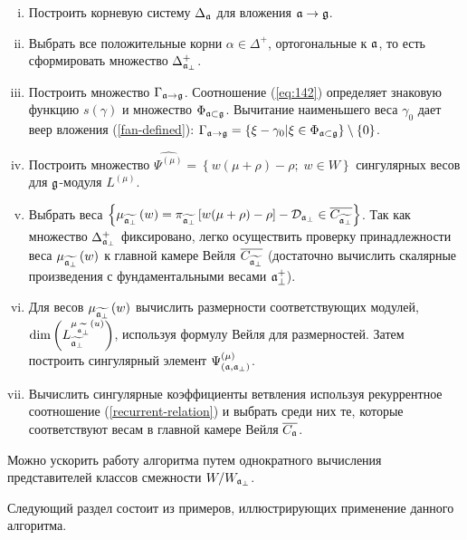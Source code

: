 \begin{enumerate}[(i)]
\item Построить корневую систему $\Delta _{\mathfrak{a}}$ для вложения $\mathfrak{a}\rightarrow \mathfrak{g}$.

\item Выбрать все положительные корни $\alpha \in \Delta ^{+}$, ортогональные к  $\mathfrak{a}$, то есть сформировать множество $\Delta_{\mathfrak{a}_{\perp} }^{+}$.

\item Построить множество $\Gamma _{\mathfrak{a}\rightarrow \mathfrak{g}}$. Соотношение  (\ref{eq:142}) определяет знаковую функцию $s(\gamma)$ и множество $\Phi_{\mathfrak{a}\subset \mathfrak{g}}$. Вычитание наименьшего веса $\gamma_0$ дает веер вложения (\ref{fan-defined}):
 $\Gamma _{\mathfrak{a}\rightarrow \mathfrak{g}}=\left\{ \xi -\gamma _{0}|\xi \in \Phi _{\mathfrak{a}\subset \mathfrak{g}}\right\} \setminus \left\{ 0\right\}$.

\item Построить множество $\widehat{\Psi ^{(\mu )}}=\left\{ w (\mu +\rho
)-\rho ;\;w \in W\right\} $ сингулярных весов для  $\mathfrak{g}$-модуля $L^{(\mu )}$.

\item Выбрать веса $\left\{ \mu _{\widetilde{\mathfrak{a}_{\perp}}}\left( w\right) =\pi _{\widetilde{\mathfrak{a}_{\perp}}}\left[ w(\mu +\rho
)-\rho \right] -\mathcal{D}_{\mathfrak{a}_{\perp}}\in \overline{C_{\widetilde{\mathfrak{a}_{\perp}}}}\right\} $. Так как множество  $\Delta_{\mathfrak{a}_{\perp} }^{+}$ фиксировано, легко осуществить проверку принадлежности веса $\mu _{\widetilde{\mathfrak{a}_{\perp}}}\left( w\right) $ к главной камере Вейля $\overline{C_{\widetilde{\mathfrak{a}_{\perp}}}}$ (достаточно вычислить скалярные произведения с фундаментальными весами $\mathfrak{a}_{\perp}^{+}$).

\item Для весов $\mu _{\widetilde{\mathfrak{a}_{\perp}}}\left( w\right) $ вычислить размерности соответствующих модулей, $\mathrm{\dim }\left(L_{\widetilde{\mathfrak{a}_{\perp}}}^{\mu _{\widetilde{\mathfrak{a}_{\perp}}}\left( u\right) }\right) $, используя формулу Вейля для размерностей. Затем построить сингулярный элемент $\Psi ^{\left( \mu \right) }_{\left(  \mathfrak{a}, \mathfrak{a}_{\perp} \right)}$.

\item Вычислить сингулярные коэффициенты ветвления используя рекуррентное соотношение (\ref{recurrent-relation}) и выбрать среди них те, которые соответствуют весам в главной камере Вейля $\overline{C_{\mathfrak{a}}}$.
\end{enumerate}

Можно ускорить работу алгоритма путем однократного вычисления представителей классов смежности $W/W_{\mathfrak{a}_{\perp} }$.

Следующий раздел состоит из примеров, иллюстрирующих применение данного алгоритма.


